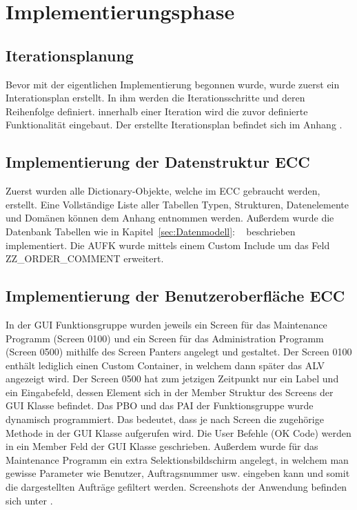 \section{Implementierungsphase} 
\label{sec:Implementierungsphase}

\subsection{Iterationsplanung}
\label{sec:Iterationsplanung}
Bevor mit der eigentlichen Implementierung begonnen wurde, wurde zuerst ein Interationsplan erstellt. In ihm werden die Iterationsschritte und deren Reihenfolge definiert. innerhalb einer Iteration wird die zuvor definierte Funktionalität eingebaut. Der erstellte Iterationsplan befindet sich im Anhang .

\subsection{Implementierung der Datenstruktur ECC}
\label{sec:Implementierung der Datenstruktur ECC}
Zuerst wurden alle Dictionary-Objekte, welche im \ac{ECC} gebraucht werden, erstellt. Eine Vollständige Liste aller Tabellen Typen, Strukturen, Datenelemente und Domänen können dem Anhang entnommen werden. Außerdem wurde die Datenbank Tabellen wie in Kapitel~\ref{sec:Datenmodell}: ~ beschrieben implementiert. Die AUFK wurde mittels einem Custom Include um das Feld ZZ\_ORDER\_COMMENT erweitert.

\subsection{Implementierung der Benutzeroberfläche ECC}
\label{sec:Implementierung der Benutzeroberfläche ECC}
In der \ac{GUI} Funktionsgruppe wurden jeweils ein Screen für das Maintenance Programm (Screen 0100) und ein Screen für das Administration Programm (Screen 0500) mithilfe des Screen Panters angelegt und gestaltet. Der Screen 0100 enthält lediglich einen Custom Container, in welchem dann später das \ac{ALV} angezeigt wird. Der Screen 0500 hat zum jetzigen Zeitpunkt nur ein Label und ein Eingabefeld, dessen Element sich in der Member Struktur des Screens der \ac{GUI} Klasse befindet. Das \ac{PBO} und das \ac{PAI} der Funktionsgruppe wurde dynamisch programmiert. Das bedeutet, dass je nach Screen die zugehörige Methode in der \ac{GUI} Klasse aufgerufen wird. Die User Befehle (OK Code) werden in ein Member Feld der \ac{GUI} Klasse geschrieben. Außerdem wurde für das Maintenance Programm ein extra Selektionsbildschirm angelegt, in welchem man gewisse Parameter wie Benutzer, Auftragsnummer usw. eingeben kann und somit die dargestellten Aufträge gefiltert werden. Screenshots der Anwendung befinden sich unter .

